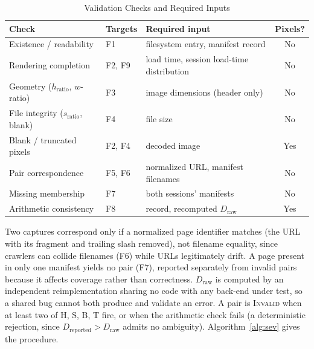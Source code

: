 \documentclass[conference]{IEEEtran}
\newcommand{\Dr}{D_{\mathrm{reported}}}
\newcommand{\Dw}{D_{\mathrm{raw}}}
\begin{document}
\begin{table}[!t]
\caption{Validation Checks and Required Inputs}
\label{tab:checks}
\centering\footnotesize
\begin{tabular}{@{}p{2.25cm}p{0.9cm}p{3.35cm}c@{}}
\toprule
Check & Targets & Required input & Pixels?\\
\midrule
Existence / readability & F1 & filesystem entry, manifest record & No\\
Rendering completion & F2, F9 & load time, session load-time distribution & No\\
Geometry ($h_{\mathrm{ratio}}$, $w$-ratio) & F3 & image dimensions (header only) & No\\
File integrity ($s_{\mathrm{ratio}}$, blank) & F4 & file size & No\\
Blank / truncated pixels & F2, F4 & decoded image & Yes\\
Pair correspondence & F5, F6 & normalized URL, manifest filenames & No\\
Missing membership & F7 & both sessions' manifests & No\\
Arithmetic consistency & F8 & record, recomputed $\Dw$ & Yes\\
\bottomrule
\end{tabular}
\end{table}

Two captures correspond only if a normalized page identifier matches (the URL with its fragment and trailing slash removed), not filename equality, since crawlers can collide filenames (F6) while URLs legitimately drift. A page present in only one manifest yields no pair (F7), reported separately from invalid pairs because it affects coverage rather than correctness. $\Dw$ is computed by an independent reimplementation sharing no code with any back-end under test, so a shared bug cannot both produce and validate an error. A pair is \textsc{Invalid} when at least two of H, S, B, T fire, or when the arithmetic check fails (a deterministic rejection, since $\Dr>\Dw$ admits no ambiguity). Algorithm~\ref{alg:sev} gives the procedure.
\end{document}
